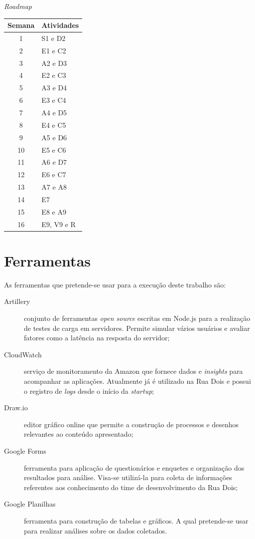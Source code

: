 \begin{quadro}
    \caption{\textit{Roadmap}\label{quad:Roadmap}}
    \begin{tabular}{ | c | l | }
    \hline
    \textbf{Semana} &
        \textbf{Atividades} \\ \hline
        1 & S1 e D2 \\ \hline
        2 & E1 e C2 \\ \hline
        3 & A2 e D3 \\ \hline
        4 & E2 e C3 \\ \hline
        5 & A3 e D4 \\ \hline
        6 & E3 e C4 \\ \hline
        7 & A4 e D5 \\ \hline
        8 & E4 e C5 \\ \hline
        9 & A5 e D6 \\ \hline
        10 & E5 e C6 \\ \hline
        11 & A6 e D7 \\ \hline
        12 & E6 e C7 \\ \hline
        13 & A7 e A8 \\ \hline
        14 & E7 \\ \hline
        15 & E8 e A9 \\ \hline
        16 & E9, V9 e R \\ \hline
    \end{tabular}
\end{quadro}

\section{Ferramentas}

As ferramentas que pretende-se usar para a execução deste trabalho são:

\begin{description}
    \item[Artillery] conjunto de ferramentas \textit{open source} escritas em Node.js
    para a realização de testes de carga em servidores. Permite simular vários usuários
    e avaliar fatores como a latência na resposta do servidor;
    \item[CloudWatch] serviço de monitoramento da Amazon que fornece dados e
    \textit{insights} para acompanhar as aplicações. Atualmente já é utilizado na
    Rua Dois e possui o registro de \textit{logs} desde o início da \textit{startup};
    \item[Draw.io] editor gráfico online que permite a construção de processos e
    desenhos relevantes ao conteúdo apresentado;
    \item[Google Forms] ferramenta para aplicação de questionários e enquetes
    e organização dos resultados para análise. Visa-se utilizá-la para coleta
    de informações referentes aos conhecimento do time de desenvolvimento da Rua Dois;
    \item[Google Planilhas] ferramenta para construção de tabelas e gráficos.
    A qual pretende-se usar para realizar análises sobre os dados coletados.
\end{description}

